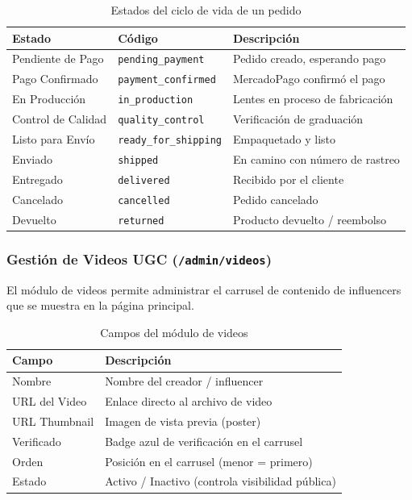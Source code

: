 \documentclass[12pt, a4paper]{article}
\begin{document}
\begin{table}[H]
\centering
\begin{tabularx}{\textwidth}{llX}
\toprule
\textbf{Estado} & \textbf{C\'{o}digo} & \textbf{Descripci\'{o}n} \\
\midrule
Pendiente de Pago & \texttt{pending\_payment} & Pedido creado, esperando pago \\
Pago Confirmado & \texttt{payment\_confirmed} & MercadoPago confirm\'{o} el pago \\
En Producci\'{o}n & \texttt{in\_production} & Lentes en proceso de fabricaci\'{o}n \\
Control de Calidad & \texttt{quality\_control} & Verificaci\'{o}n de graduaci\'{o}n \\
Listo para Env\'{i}o & \texttt{ready\_for\_shipping} & Empaquetado y listo \\
Enviado & \texttt{shipped} & En camino con n\'{u}mero de rastreo \\
Entregado & \texttt{delivered} & Recibido por el cliente \\
Cancelado & \texttt{cancelled} & Pedido cancelado \\
Devuelto & \texttt{returned} & Producto devuelto / reembolso \\
\bottomrule
\end{tabularx}
\caption{Estados del ciclo de vida de un pedido}
\end{table}

\subsubsection{Gesti\'{o}n de Videos UGC (\texttt{/admin/videos})}

El m\'{o}dulo de videos permite administrar el carrusel de contenido de influencers que se muestra en la p\'{a}gina principal.

\begin{table}[H]
\centering
\begin{tabularx}{\textwidth}{lX}
\toprule
\textbf{Campo} & \textbf{Descripci\'{o}n} \\
\midrule
Nombre & Nombre del creador / influencer \\
URL del Video & Enlace directo al archivo de video \\
URL Thumbnail & Imagen de vista previa (poster) \\
Verificado & Badge azul de verificaci\'{o}n en el carrusel \\
Orden & Posici\'{o}n en el carrusel (menor = primero) \\
Estado & Activo / Inactivo (controla visibilidad p\'{u}blica) \\
\bottomrule
\end{tabularx}
\caption{Campos del m\'{o}dulo de videos}
\end{table}
\end{document}
